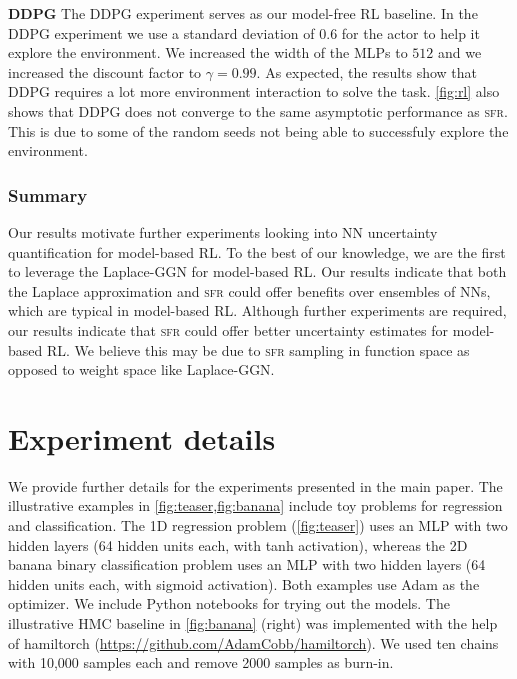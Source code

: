 \documentclass{article}
\newcommand{\our}{\textsc{sfr}\xspace}
\begin{document}
\textbf{DDPG}
The DDPG experiment serves as our model-free RL baseline.
In the DDPG experiment we use a standard deviation of $0.6$ for the actor to help it explore
the environment.
We increased the width of the MLPs to $512$ and we increased the discount factor to $\gamma=0.99$.
As expected, the results show that DDPG requires a lot more environment interaction to solve the task.
\cref{fig:rl} also shows that DDPG does not converge to the same asymptotic performance as \our.
This is due to some of the random seeds not being able to successfuly explore the environment.

\subsubsection{Summary}
Our results motivate further experiments looking into NN uncertainty quantification
for model-based RL.
To the best of our knowledge, we are the first to leverage the Laplace-GGN for model-based RL.
Our results indicate that both the Laplace approximation and \our could offer benefits over
ensembles of NNs, which are typical in model-based RL.
Although further experiments are required, our results indicate that \our could offer
better uncertainty estimates for model-based RL.
We believe this may be due to \our sampling in function space as opposed to weight space like
Laplace-GGN.


\section{Experiment details}
\label{app:experiments}
%
We provide further details for the experiments presented in the main paper. The illustrative examples in \cref{fig:teaser,fig:banana} include toy problems for regression and classification. The 1D regression problem (\cref{fig:teaser}) uses an MLP with two hidden layers (64 hidden units each, with tanh activation), whereas the 2D banana binary classification problem uses an MLP with two hidden layers (64 hidden units each, with sigmoid activation). Both examples use Adam as the optimizer. We include Python notebooks for trying out the models. The illustrative HMC baseline in \cref{fig:banana} (right) was implemented with the help of hamiltorch (\url{https://github.com/AdamCobb/hamiltorch}). We used ten chains with 10,000 samples each and remove 2000 samples as burn-in.
\end{document}

